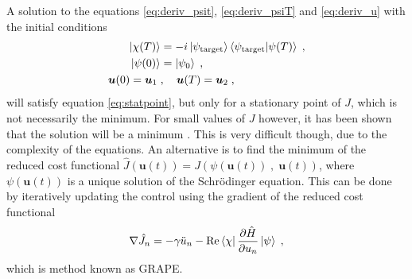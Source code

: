 A solution to the equations \ref{eq:deriv_psit}, \ref{eq:deriv_psiT} and \ref{eq:deriv_u} with the initial conditions
\begin{align}
	\ket{\chi (T)} &= -i \ket{\psi_{\mathrm{target}}} \braket{\psi_{\mathrm{target}} | \psi (T)} \; , \\
	\ket{\psi (0)} &= \ket{\psi _0} \; , \\
	\boldsymbol{u}(0) = \boldsymbol{u}_1 \; &, \quad \boldsymbol{u}(T) = \boldsymbol{u}_2 \; ,
\end{align}
will satisfy equation \ref{eq:statpoint}, but only for a stationary point of $J$, which is not necessarily the minimum. For small values of $J$ however, it has been shown that the solution will be a minimum \cite{BECcontrol}. This is very difficult though, due to the complexity of the equations. An alternative is to find the minimum of the reduced cost functional $\hat{J}\left( \boldsymbol{u}(t) \right) =  J\left(\psi(\boldsymbol{u}(t)) \; , \; \boldsymbol{u}(t) \right)$, where $\psi(\boldsymbol{u}(t))$ is a unique solution of the Schrödinger equation. This can be done by iteratively updating the control using the gradient of the reduced cost functional
\begin{equation}
	\nabla \hat{J}_n = - \gamma \ddot{u}_n - \Re \bra{\chi} \pdv{\hat{H}}{u_n} \ket{\psi} \; ,
\end{equation}
which is method known as GRAPE. 